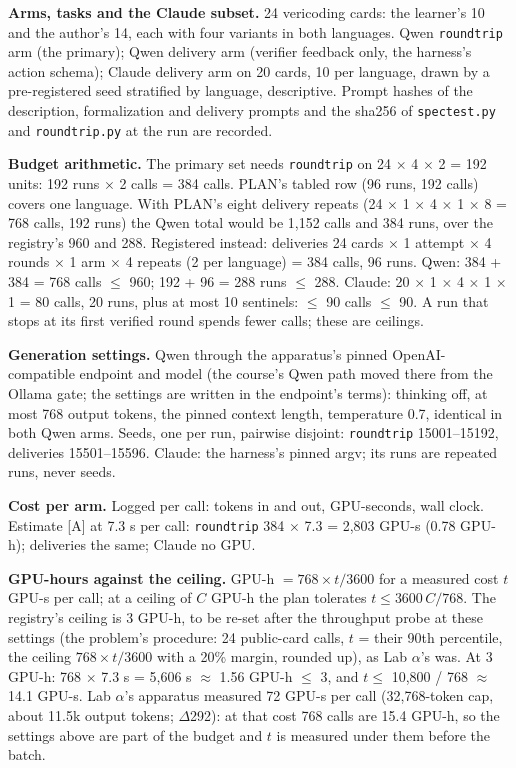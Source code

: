 \documentclass[11pt]{article}
\begin{document}
\begin{answer}
\textbf{Arms, tasks and the Claude subset.} 24 vericoding cards: the
learner's 10 and the author's 14, each with four variants in both languages.
Qwen \texttt{roundtrip} arm (the primary); Qwen delivery arm (verifier feedback
only, the harness's action schema); Claude delivery arm on 20 cards, 10 per
language, drawn by a pre-registered seed stratified by language, descriptive.
Prompt hashes of the description, formalization and delivery prompts and the
sha256 of \texttt{spectest.py} and \texttt{roundtrip.py} at the run are
recorded.

\textbf{Budget arithmetic.} The primary set needs \texttt{roundtrip} on 24
$\times$ 4 $\times$ 2 = 192 units: 192 runs $\times$ 2 calls = 384 calls.
PLAN's tabled row (96 runs, 192 calls) covers one language. With PLAN's eight
delivery repeats (24 $\times$ 1 $\times$ 4 $\times$ 1 $\times$ 8 = 768 calls,
192 runs) the Qwen total would be 1,152 calls and 384 runs, over the
registry's 960 and 288. Registered instead: deliveries 24 cards $\times$ 1
attempt $\times$ 4 rounds $\times$ 1 arm $\times$ 4 repeats (2 per language) =
384 calls, 96 runs. Qwen: 384 + 384 = 768 calls $\le$ 960; 192 + 96 = 288 runs
$\le$ 288. Claude: 20 $\times$ 1 $\times$ 4 $\times$ 1 $\times$ 1 = 80 calls,
20 runs, plus at most 10 sentinels: $\le$ 90 calls $\le$ 90. A run that stops at
its first verified round spends fewer calls; these are ceilings.

\textbf{Generation settings.} Qwen through the apparatus's pinned
OpenAI-compatible endpoint and model (the course's Qwen path moved there from
the Ollama gate; the settings are written in the endpoint's terms): thinking
off, at most 768 output tokens, the pinned context length, temperature 0.7,
identical in both Qwen arms. Seeds, one per run, pairwise
disjoint: \texttt{roundtrip} 15001--15192, deliveries 15501--15596. Claude:
the harness's pinned argv; its runs are repeated runs, never seeds.

\textbf{Cost per arm.} Logged per call: tokens in and out, GPU-seconds, wall
clock. Estimate [A] at 7.3 s per call: \texttt{roundtrip} 384 $\times$ 7.3 =
2,803 GPU-s (0.78 GPU-h); deliveries the same; Claude no GPU.

\textbf{GPU-hours against the ceiling.} GPU-h $= 768 \times t / 3600$ for a
measured cost $t$ GPU-s per call; at a ceiling of $C$ GPU-h the plan tolerates
$t \le 3600\,C / 768$. The registry's ceiling is 3 GPU-h, to be re-set after the
throughput probe at these settings (the problem's procedure: 24 public-card
calls, $t$ = their 90th percentile, the ceiling $768 \times t / 3600$ with a
20\% margin, rounded up), as Lab $\alpha$'s was. At 3 GPU-h: 768 $\times$ 7.3
s = 5,606 s $\approx$ 1.56 GPU-h $\le$ 3, and $t \le$ 10,800 / 768 $\approx$
14.1 GPU-s. Lab $\alpha$'s apparatus measured 72 GPU-s per call (32,768-token
cap, about 11.5k output tokens; $\Delta$292): at that cost 768 calls are 15.4
GPU-h, so the settings above are part of the budget and $t$ is measured under
them before the batch.


\end{answer}
\end{document}
